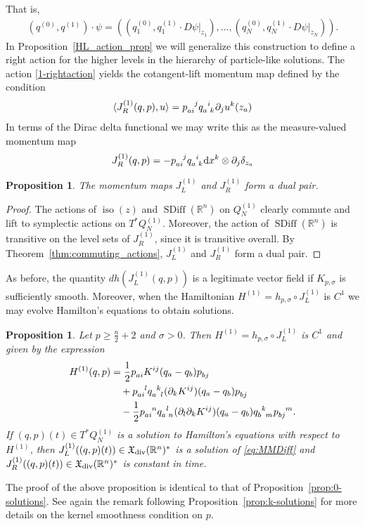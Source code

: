 \documentclass[12pt]{amsart}
\newcommand{\R}{\ensuremath{\mathbb{R}}}
\newcommand{\dx}{\ensuremath{\textrm{d}x}}
\newtheorem{prop}[thm]{Proposition}
\DeclareMathOperator{\SDiff}{SDiff}
\DeclareMathOperator{\iso}{iso}
\begin{document}
	 That is, 
 \begin{align}
	 (q^{(0)}, q^{(1)}) \cdot \psi = \left( \left(q_1^{(0)}, q_1^{(1)} \cdot D\psi|_{z_1}\right), \ldots, \left(q_N^{(0)}, q_N^{(1)} \cdot D\psi|_{z_N}\right)\right). \label{1-rightaction}
\end{align}
In Proposition~\ref{HL_action_prop} we will generalize this construction to define a right action for the higher levels in the hierarchy of particle-like solutions.
  The action \eqref{1-rightaction} yields the cotangent-lift momentum map defined by the condition
  \begin{align*}
    \langle J_R^{(1)}(q,p) , u \rangle = p\indices{_a_i^j} q\indices{_a^i_k} \partial_j u^k(z_a)
  \end{align*}
  In terms of the Dirac delta functional we may write this as the measure-valued momentum map
  \begin{align*}
    J_R^{(1)}(q,p) = - p\indices{_a_i^j} q\indices{_a^i_k} \dx^k \otimes \partial_j \delta_{z_a}
  \end{align*}
  \begin{prop}
    The momentum maps $J_L^{(1)}$ and $J_R^{(1)}$ form a dual pair.
  \end{prop}
  \begin{proof}
    The actions of $\iso(z)$ and $\SDiff(\R^n)$ on $Q_N^{(1)}$
    clearly commute
    and lift to symplectic actions on $T^*Q_N^{(1)}$.
    Moreover, the action of $\SDiff(\R^n)$ is transitive on the level sets of $J_R^{(1)}$, since it is transitive overall.
    By Theorem~\ref{thm:commuting_actions}, $J_L^{(1)}$ and $J_R^{(1)}$ form a dual pair.
  \end{proof}

  As before, the quantity $dh( J_L^{(1)}(q,p))$ is a legitimate vector field
  if $K_{p,\sigma}$ is sufficiently smooth.  Moreover, when the Hamiltonian
  $H^{(1)} = h_{p,\sigma} \circ J_L^{(1)}$ is $C^1$ we may evolve Hamilton's equations
  to obtain solutions.

  \begin{prop} \label{prop:1-solutions}
    Let $p \ge \frac{n}{2} + 2$ and $\sigma > 0$.
    Then $H^{(1)} = h_{p,\sigma} \circ J_L^{(1)}$ is $C^1$ and given by the expression
	\begin{align*}
		H^{(1)}(q,p) &= \frac{1}{2} p\indices{_a_i} K^{ij}(q_a - q_b) p\indices{_b_j}\\
			&\quad + p\indices{_a_i^l} q\indices{_a^k_l} (\partial_k K^{ij})(q_a - q_b) p\indices{_b_j} \\
			&\quad -  \frac{1}{2} p\indices{_a_i^n} q\indices{_a^l_n} (\partial_l \partial_k K^{ij})(q_a - q_b) q\indices{_b^k_m} p\indices{_b_j^m}.
  \end{align*}
  If $(q,p)(t) \in T^*Q_N^{(1)}$ is a solution to Hamilton's equations with respect to
	$H^{(1)}$, then $J_L^{(1)}( (q,p)(t)) \in \mathfrak{X}_{\rm div}(\R^n)^*$ is
	a solution of \eqref{eq:MMDiff} and $J_R^{(1)}( (q,p)(t)) \in \mathfrak{X}_{\rm div}(\R^n)^*$ is
	constant in time. 
  \end{prop}
  The proof of the above proposition is identical to that of
  Proposition~\ref{prop:0-solutions}. See again the remark following
  Proposition~\ref{prop:k-solutions} for more details on the kernel
  smoothness condition on $p$.
\end{document}
